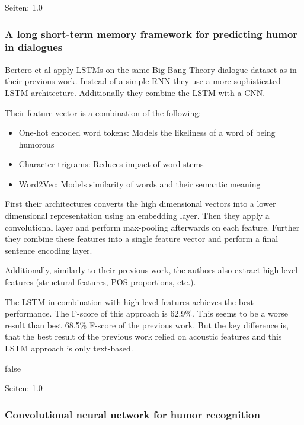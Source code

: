 \documentclass[draft,final,oneside]{vutinfth} %
\begin{document}
Seiten: 1.0

\cite{Bertero2016DeepLO}
\fi

\subsubsection{A long short-term memory framework for predicting humor in dialogues \cite{bertero2016long}}

Bertero et al apply LSTMs on the same Big Bang Theory dialogue dataset as in their previous work. \cite{Bertero2016DeepLO} Instead of a simple RNN they use a more sophisticated LSTM architecture. Additionally they combine the LSTM with a CNN.

Their feature vector is a combination of the following:
\begin{itemize}

\item One-hot encoded word tokens: Models the likeliness of a word of being humorous
\item Character trigrams: Reduces impact of word stems
\item Word2Vec: Models similarity of words and their semantic meaning

\end{itemize}

First their architectures converts the high dimensional vectors into a lower dimensional representation using an embedding layer. Then they apply a convolutional layer and perform max-pooling afterwards on each feature. Further they combine these features into a single feature vector and perform a final sentence encoding layer. 

Additionally, similarly to their previous work, the authors also extract high level features (structural features, POS proportions, etc.).

The LSTM in combination with high level features achieves the best performance. The F-score of this approach is 62.9\%. This seems to be a worse result than best 68.5\% F-score of the previous work. But the key difference is, that the best result of the previous work relied on acoustic features and this LSTM approach is only text-based.

\if false
\cite{bertero2016long}

Seiten: 1.0
\fi

\subsubsection{Convolutional neural network for humor recognition \cite{chen2017convolutional}}
\end{document}
